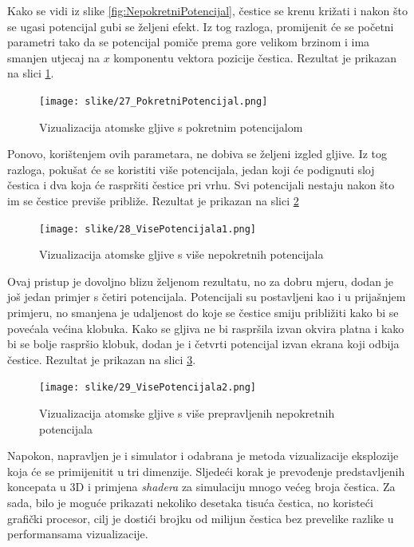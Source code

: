 \documentclass{foi}
\begin{document}
Kako se vidi iz slike \ref{fig:NepokretniPotencijal}, čestice se krenu križati i nakon što se ugasi potencijal gubi se željeni efekt. Iz tog razloga, promijenit će se početni parametri tako da se potencijal pomiče prema gore velikom brzinom i ima smanjen utjecaj na $x$ komponentu vektora pozicije čestica. Rezultat je prikazan na slici \ref{fig:PokretniPotencijal}.

\begin{figure}[H]
    \centering
    \texttt{[image: slike/27\_PokretniPotencijal.png]}
    \captionsetup{justification=centering}
    \caption{Vizualizacija atomske gljive s pokretnim potencijalom}
\label{fig:PokretniPotencijal}
\end{figure}

Ponovo, korištenjem ovih parametara, ne dobiva se željeni izgled gljive. Iz tog razloga, pokušat će se koristiti više potencijala, jedan koji će podignuti sloj čestica i dva koja će raspršiti čestice pri vrhu.  Svi potencijali nestaju nakon što im se čestice previše približe. Rezultat je prikazan na slici \ref{fig:VisePotencijala1}

\begin{figure}[H]
    \centering
    \texttt{[image: slike/28\_VisePotencijala1.png]}
    \captionsetup{justification=centering}
    \caption{Vizualizacija atomske gljive s više nepokretnih potencijala}
\label{fig:VisePotencijala1}
\end{figure}

Ovaj pristup je dovoljno blizu željenom rezultatu, no za dobru mjeru, dodan je još jedan primjer s četiri potencijala. Potencijali su postavljeni kao i u prijašnjem primjeru, no smanjena je udaljenost do koje se čestice smiju približiti kako bi se povećala većina klobuka. Kako se gljiva ne bi raspršila izvan okvira platna i kako bi se bolje raspršio klobuk, dodan je i četvrti potencijal izvan ekrana koji odbija čestice. Rezultat je prikazan na slici \ref{fig:VisePotencijala2}.


\begin{figure}[H]
    \centering
    \texttt{[image: slike/29\_VisePotencijala2.png]}
    \captionsetup{justification=centering}
    \caption{Vizualizacija atomske gljive s više prepravljenih nepokretnih potencijala}
\label{fig:VisePotencijala2}
\end{figure}

Napokon, napravljen je i simulator i odabrana je metoda vizualizacije eksplozije koja će se primijenitit u tri dimenzije. Sljedeći korak je prevođenje predstavljenih koncepata u 3D i primjena \textit{shadera} za simulaciju mnogo većeg broja čestica. Za sada, bilo je moguće prikazati nekoliko desetaka tisuća čestica, no koristeći grafički procesor, cilj je dostići brojku od milijun čestica bez prevelike razlike u performansama vizualizacije.
\end{document}
